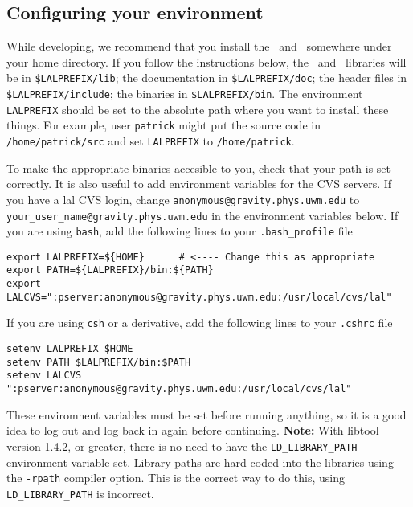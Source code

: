 \color{black}
\subsection{Configuring your environment}\label{ss:config}
\color{black}

While developing,  we recommend that you install the \lal\ and \lalapps\
somewhere under your home directory.  If you follow the
instructions below,  the \lal\ and \lalapps\ libraries will be in
\verb+$LALPREFIX/lib+;  the documentation in \verb+$LALPREFIX/doc+; the header
files in \verb+$LALPREFIX/include+; the binaries in \verb+$LALPREFIX/bin+.
The environment \verb+LALPREFIX+ should be set to the absolute path where you
want to install these things.  For example,  user \texttt{patrick} might put
the source code in \verb+/home/patrick/src+ and set \verb+LALPREFIX+ to
\verb+/home/patrick+.

To make the appropriate binaries accesible to you,  check that your path is
set correctly. It is also useful to add environment variables for the CVS
servers. If you have a lal CVS login, change
\verb+anonymous@gravity.phys.uwm.edu+ to
\verb+your_user_name@gravity.phys.uwm.edu+ in the environment variables below.
If you are using \texttt{bash}, add
the following lines to your \texttt{.bash\_profile} file
\begin{verbatim}
export LALPREFIX=${HOME}      # <---- Change this as appropriate
export PATH=${LALPREFIX}/bin:${PATH}
export LALCVS=":pserver:anonymous@gravity.phys.uwm.edu:/usr/local/cvs/lal"
\end{verbatim}
If you are using \texttt{csh} or a derivative,  add the following lines to
your \texttt{.cshrc} file
\begin{verbatim}
setenv LALPREFIX $HOME
setenv PATH $LALPREFIX/bin:$PATH
setenv LALCVS ":pserver:anonymous@gravity.phys.uwm.edu:/usr/local/cvs/lal"
\end{verbatim}
These enviromnent variables must be set before running anything,
so it is a good idea to log out and log back in again before
continuing.   \textbf{Note:} With libtool version 1.4.2, or greater, there is
no need to have the \verb+LD_LIBRARY_PATH+ environment variable set. Library
paths are hard coded into the libraries using the \texttt{-rpath}
compiler option. This is the correct way to do this,  using
\verb+LD_LIBRARY_PATH+ is incorrect.  

